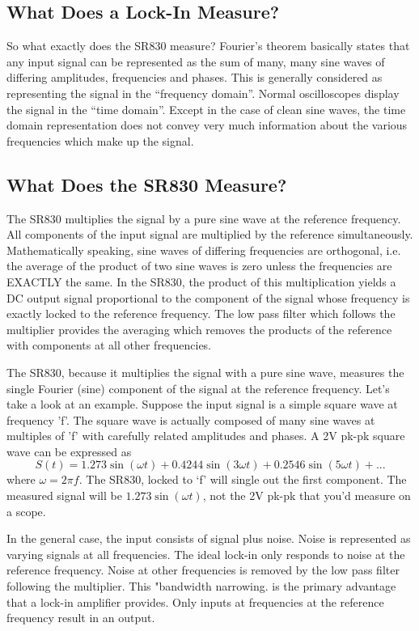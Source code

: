 \documentclass{../lab}
\begin{document}
\subsection{What Does a Lock-In Measure?}

So what exactly does the SR830 measure? Fourier's theorem basically states that any input signal can be represented as the sum of many, many sine waves of differing amplitudes, frequencies and phases. This is generally considered as representing the signal in the ``frequency domain''. Normal oscilloscopes display the signal in the ``time domain''. Except in the case of clean sine waves, the time domain representation does not convey very much information about the various frequencies which make up the signal.

\subsection{What Does the SR830 Measure?}

The SR830 multiplies the signal by a pure sine wave at the reference frequency. All components of the input signal are multiplied by the reference simultaneously. Mathematically speaking, sine waves of differing frequencies are orthogonal, i.e. the average of the product of two sine waves is zero unless the frequencies are EXACTLY the same. In the SR830, the product of this multiplication yields a DC output signal proportional to the component of the signal whose frequency is exactly locked to the reference frequency. The low pass filter which follows the multiplier provides the averaging which removes the products of the reference with components at all other frequencies.

The SR830, because it multiplies the signal with a pure sine wave, measures the single Fourier (sine) component of the signal at the reference frequency. Let's take a look at an example. Suppose the input signal is a simple square wave at frequency 'f'. The square wave is actually composed of many sine waves at multiples of 'f' with carefully related amplitudes and phases. A 2V pk-pk square wave can be expressed as
\[
    S(t) = 1.273 \sin(\omega t) + 0.4244 \sin(3 \omega t) + 0.2546 \sin(5 \omega t) + ...
\]
where $\omega = 2 \pi f$. The SR830, locked to `f' will single out the first component. The measured signal will be $1.273 \sin(\omega t)$, not the 2V pk-pk that you'd measure on a scope.

In the general case, the input consists of signal plus noise. Noise is represented as varying signals at all frequencies. The ideal lock-in only responds to noise at the reference frequency. Noise at other frequencies is removed by the low pass filter following the multiplier. This "bandwidth narrowing. is the primary advantage that a lock-in amplifier provides. Only inputs at frequencies at the reference frequency result in an output.
\end{document}
